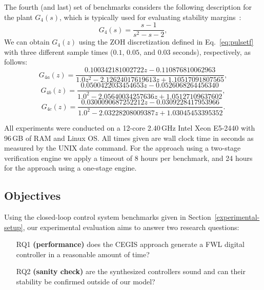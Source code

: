 \documentclass[final]{sig-alternate-05-2015}
\begin{document}
The fourth (and last) set of benchmarks considers the following description
for the plant $G_{4}(s)$, which is typically used for evaluating stability
margins~\cite{bhattacharyya97, keel_Bhattacharyya_examples}:
%
\begin{equation}
\label{exampleA}
G_{4}(s)=\frac{s-1}{s^{2}-s-2},
\end{equation}
%
\noindent We can obtain $G_{4}(z)$ using the ZOH discretization defined
in Eq.~\eqref{eq:pulsetf} with three different sample times ($0.1$, $0.05$,
and $0.03$ seconds), respectively, as follows:
%
\begin{equation}
\label{exampleA-sampletime1}
G_{4a}(z)=\frac{0.100342181002722z - 0.110876810062963}{1.0z^{2} - 2.12624017619613z + 1.10517091807565}, \nonumber
\end{equation}
%
%
\begin{equation}
\label{exampleA-sampletime2}
G_{4b}(z)=\frac{0.0500422033454653z - 0.0526068264456340}{1.0^{2} - 2.05640034257636z + 1.05127109637602}, \nonumber
\end{equation}
%
%
\begin{equation}
\label{exampleA-sampletime3}
G_{4c}(z)=\frac{0.0300090687252212z - 0.0309228417953966}{1.0^{2} - 2.03228208009387z + 1.03045453395352}. \nonumber
\end{equation}

All experiments were conducted on a 12-core 2.40\,GHz Intel Xeon E5-2440
with 96\,GB of RAM and Linux OS.  All times given are wall clock time in
seconds as measured by the UNIX date command.  For the approach using a
two-stage verification engine we apply a timeout of 8 hours per benchmark,
and 24 hours for the approach using a one-stage engine.

\subsection{Objectives}
\label{experimental-objectives}

Using the closed-loop control system benchmarks given in
Section~\ref{experimental-setup}, our experimental evaluation aims to answer
two research questions:
%
\begin{enumerate}

\item[RQ1] \textbf{(performance)} does the CEGIS approach generate a 
FWL digital controller in a reasonable amount of time?

\item[RQ2] \textbf{(sanity check)} are the synthesized controllers sound
and can their stability be confirmed outside of our model?

\end{enumerate}
\end{document}
